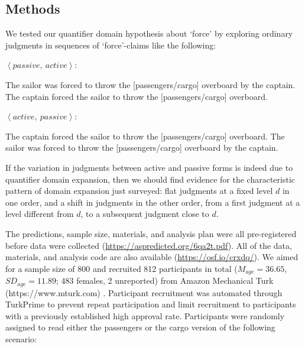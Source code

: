 \documentclass{salt}
\newcommand{\seq}[1]{\left\langle {#1} \right\rangle}
\begin{document}
\subsection{Methods}

We tested our quantifier domain hypothesis about `force' by exploring ordinary judgments in sequences of `force'-claims like the following: 

\begin{exe}\ex \label{sail-capt} $\seq{passive,~ active}$: \begin{xlist}\ex The sailor was forced to throw the [passengers/cargo] overboard by the captain. \ex The captain forced the sailor to throw the [passengers/cargo] overboard. \end{xlist}\end{exe}

\begin{exe}\ex \label{capt-sail} $\seq{active,~ passive}$: \begin{xlist}\ex The captain forced the sailor to throw the [passengers/cargo] overboard. \ex The sailor was forced to throw the [passengers/cargo] overboard by the captain. \end{xlist}\end{exe}

\noindent If the variation in judgments between active and passive forms is indeed due to quantifier domain expansion, then we should find evidence for the characteristic pattern of domain expansion just surveyed: flat judgments at a fixed level $d$ in one order, and a shift in judgments in the other order, from a first judgment at a  level different from $d$, to a subsequent judgment close to $d$.

The predictions, sample size, materials, and analysis plan were all pre-registered before data were collected (\url{https://aspredicted.org/6qa2t.pdf}). All of the data, materials, and analysis code are also available (\url{https://osf.io/crxdq/}). We aimed for a sample size of 800 and recruited 812 participants in total ($M_{age}=36.65$, $SD_{age}=11.89$; 483 females, 2 unreported) from Amazon Mechanical Turk (https://www.mturk.com) \citep{buhrmester2011amazon}. Participant recruitment was automated through TurkPrime to prevent repeat participation and limit recruitment to participants with a previously established high approval rate. Participants were randomly assigned to read either the passengers or the cargo version of the following scenario: 
\end{document}
